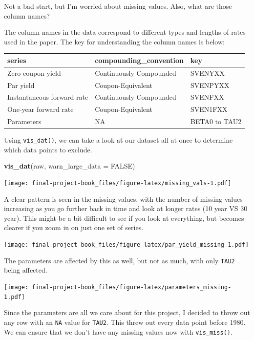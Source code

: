 \documentclass[]{book}
\newenvironment{Shaded}{\begin{snugshade}}{\end{snugshade}}
\newcommand{\DataTypeTok}[1]{\textcolor[rgb]{0.13,0.29,0.53}{#1}}
\newcommand{\KeywordTok}[1]{\textcolor[rgb]{0.13,0.29,0.53}{\textbf{#1}}}
\newcommand{\NormalTok}[1]{#1}
\newcommand{\OtherTok}[1]{\textcolor[rgb]{0.56,0.35,0.01}{#1}}
\theoremstyle{definition}
\theoremstyle{definition}
\theoremstyle{definition}
\theoremstyle{remark}
\begin{document}
Not a bad start, but I'm worried about missing values. Also, what are
those column names?

The column names in the data correspond to different types and lengths
of rates used in the paper. The key for understanding the column names
is below:

\begin{tabular}{l|l|l}
\hline
series & compounding\_convention & key\\
\hline
Zero-coupon yield & Continuously Compounded & SVENYXX\\
\hline
Par yield & Coupon-Equivalent & SVENPYXX\\
\hline
Instantaneous forward rate & Continuously Compounded & SVENFXX\\
\hline
One-year forward rate & Coupon-Equivalent & SVEN1FXX\\
\hline
Parameters & NA & BETA0 to TAU2\\
\hline
\end{tabular}

Using \texttt{vis\_dat()}, we can take a look at our dataset all at once
to determine which data points to exclude.

\begin{Shaded}
\begin{Highlighting}[]
\KeywordTok{vis_dat}\NormalTok{(raw, }\DataTypeTok{warn_large_data =} \OtherTok{FALSE}\NormalTok{)}
\end{Highlighting}
\end{Shaded}

\texttt{[image: final-project-book\_files/figure-latex/missing\_vals-1.pdf]}

A clear pattern is seen in the missing values, with the number of
missing values increasing as you go further back in time and look at
longer rates (10 year VS 30 year). This might be a bit difficult to see
if you look at everything, but becomes clearer if you zoom in on just
one set of series.

\texttt{[image: final-project-book\_files/figure-latex/par\_yield\_missing-1.pdf]}

The parameters are affected by this as well, but not as much, with only
\texttt{TAU2} being affected.

\texttt{[image: final-project-book\_files/figure-latex/parameters\_missing-1.pdf]}

Since the parameters are all we care about for this project, I decided
to throw out any row with an \texttt{NA} value for \texttt{TAU2}. This
threw out every data point before 1980. We can ensure that we don't have
any missing values now with \texttt{vis\_miss()}.
\end{document}
